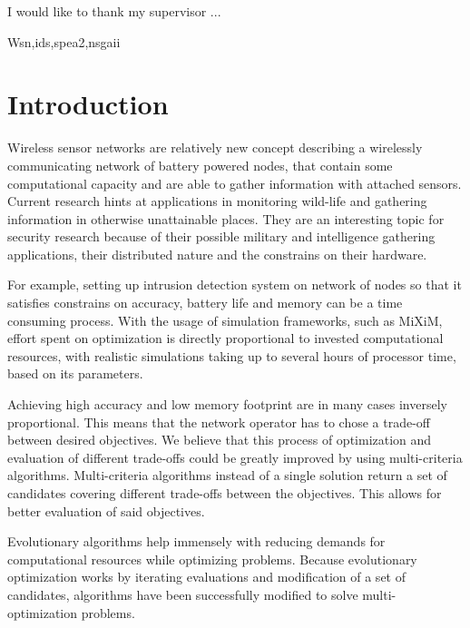 \documentclass[12pt,oneside]{fithesis2}
\begin{document}
\FrontMatter
\ThesisTitlePage
\begin{ThesisDeclaration}
\DeclarationText
\AdvisorName
\end{ThesisDeclaration}
\begin{ThesisThanks}
I would like to thank my supervisor ...
\end{ThesisThanks}
\begin{ThesisAbstract}
\end{ThesisAbstract}
 
\begin{ThesisKeyWords}
Wsn,ids,spea2,nsgaii
\end{ThesisKeyWords}

\tableofcontents %

\MainMatter
\chapter{Introduction}
\label{chap:intro}
Wireless sensor networks are relatively new concept describing a wirelessly communicating network of battery powered nodes, that contain some computational capacity and are able to gather information with attached sensors. Current research hints at applications in monitoring wild-life and gathering information in otherwise unattainable places. They are an interesting topic for security research because of their possible military and intelligence gathering applications, their distributed nature and the constrains on their hardware. 

For example, setting up intrusion detection system on network of nodes so that it satisfies constrains on accuracy, battery life and memory can be a time consuming process. With the usage of simulation frameworks, such as MiXiM, effort spent on optimization is directly proportional to invested computational resources, with realistic simulations taking up to several hours of processor time, based on its parameters.

Achieving high accuracy and low memory footprint are in many cases inversely proportional. This means that the network operator has to chose a trade-off between desired objectives.  We believe that this process of optimization and evaluation of different trade-offs could be greatly improved by using multi-criteria algorithms. Multi-criteria algorithms instead of a single solution return a set of candidates covering different trade-offs between the objectives. This allows for better evaluation of said objectives.

Evolutionary algorithms help immensely with reducing demands for computational resources while optimizing problems. Because evolutionary optimization works by iterating evaluations and modification of a set of candidates, algorithms have been successfully modified to solve multi-optimization problems.
\end{document}
